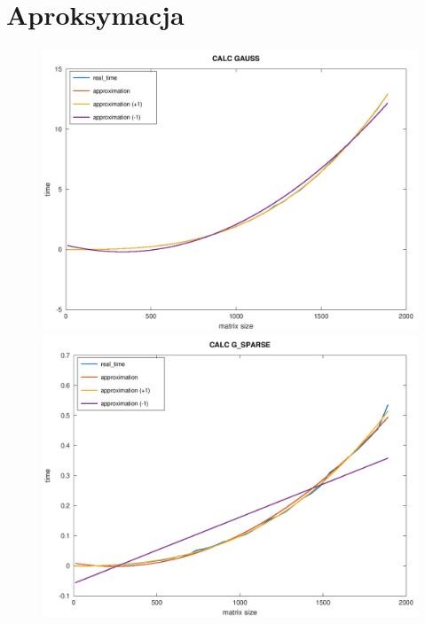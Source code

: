 \documentclass[10pt]{article}
\begin{document}
\section{Aproksymacja}
\begin{figure}[h]
	\centering
	\includegraphics[scale=0.45]{plots/07_calc_gauss_plus_minus_time.png}
	\includegraphics[scale=0.45]{plots/09_calc_gauss_sparse_plus_minus_time.png}
\end{figure}
\end{document}
